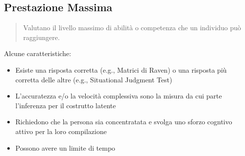 \documentclass[compress]{beamer}
\begin{document}
\subsection{Prestazione Massima}

\begin{frame}
	
	\begin{quote}
		Valutano il livello massimo di abilità o competenza che un individuo può raggiungere.
	\end{quote}

Alcune caratteristiche: 

\begin{itemize}
\item Esiste una risposta corretta (e.g., Matrici di Raven) o una risposta più corretta delle altre (e.g., Situational Judgment Test)
\item L'accuratezza e/o la velocità complessiva sono la misura da cui parte l'inferenza per il costrutto latente
\item Richiedono che la persona sia concentratata e svolga uno sforzo cogntivo attivo per la loro compilazione
\item Possono avere un limite di tempo
\end{itemize}	
\end{frame}
\end{document}
